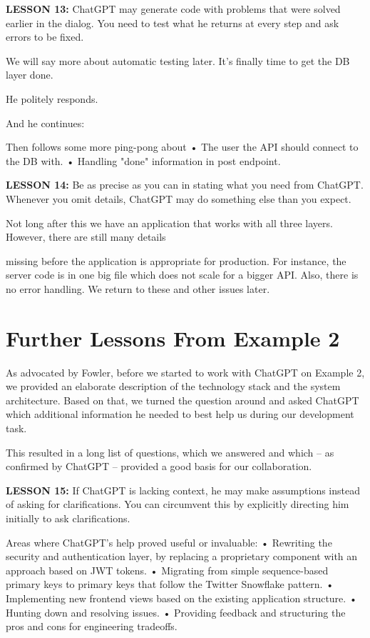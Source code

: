 \documentclass[runningheads]{llncs}
\begin{document}
\textbf{LESSON 13:} ChatGPT may generate code with problems that were solved earlier in the dialog. You need to test what he returns at every step and ask errors to be fixed.

We will say more about automatic testing later. It's finally time to get the DB layer done.

He politely responds.

And he continues:

Then follows some more ping-pong about
• The user the API should connect to the DB with.
• Handling "done" information in post endpoint.

\textbf{LESSON 14:} Be as precise as you can in stating what you need from ChatGPT. Whenever you omit details, ChatGPT may do something else than you expect.

Not long after this we have an application that works with all three layers. However, there are still many details

missing before the application is appropriate for production. For instance, the server code is in one big file which does not scale for a bigger API. Also, there is no error handling. We return to these and other issues later.

\section{Further Lessons From Example 2}
As advocated by Fowler\cite{Fowler2023}, before we started to work with ChatGPT on Example 2, we provided an elaborate description of the technology stack and the system architecture. Based on that, we turned the question around and asked ChatGPT which additional information he needed to best help us during our development task.

This resulted in a long list of questions, which we answered and which – as confirmed by ChatGPT – provided a good basis for our collaboration.

\textbf{LESSON 15:} If ChatGPT is lacking context, he may make assumptions instead of asking for clarifications. You can circumvent this by explicitly directing him initially to ask clarifications.

Areas where ChatGPT's help proved useful or invaluable:
• Rewriting the security and authentication layer,
by replacing a proprietary component with an
approach based on JWT tokens.
• Migrating from simple sequence-based primary
keys to primary keys that follow the Twitter
Snowflake pattern.
• Implementing new frontend views based on the
existing application structure.
• Hunting down and resolving issues.
• Providing feedback and structuring the pros and
cons for engineering tradeoffs.
\end{document}
